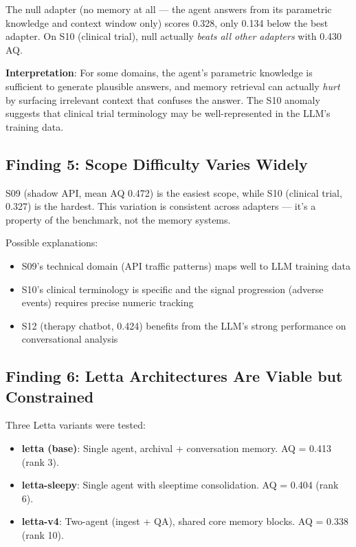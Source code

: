 \documentclass[11pt,a4paper]{article}
\begin{document}
The null adapter (no memory at all --- the agent answers from its parametric knowledge and context window only) scores 0.328, only 0.134 below the best adapter.
On S10 (clinical trial), null actually \emph{beats all other adapters} with 0.430 AQ.

\textbf{Interpretation}: For some domains, the agent's parametric knowledge is sufficient to generate plausible answers, and memory retrieval can actually \emph{hurt} by surfacing irrelevant context that confuses the answer.
The S10 anomaly suggests that clinical trial terminology may be well-represented in the LLM's training data.

\subsection{Finding 5: Scope Difficulty Varies Widely}

S09 (shadow API, mean AQ 0.472) is the easiest scope, while S10 (clinical trial, 0.327) is the hardest.
This variation is consistent across adapters --- it's a property of the benchmark, not the memory systems.

Possible explanations:
\begin{itemize}[nosep]
  \item S09's technical domain (API traffic patterns) maps well to LLM training data
  \item S10's clinical terminology is specific and the signal progression (adverse events) requires precise numeric tracking
  \item S12 (therapy chatbot, 0.424) benefits from the LLM's strong performance on conversational analysis
\end{itemize}

\subsection{Finding 6: Letta Architectures Are Viable but Constrained}

Three Letta variants were tested:
\begin{itemize}[nosep]
  \item \textbf{letta (base)}: Single agent, archival + conversation memory. AQ = 0.413 (rank 3).
  \item \textbf{letta-sleepy}: Single agent with sleeptime consolidation. AQ = 0.404 (rank 6).
  \item \textbf{letta-v4}: Two-agent (ingest + QA), shared core memory blocks. AQ = 0.338 (rank 10).
\end{itemize}
\end{document}

